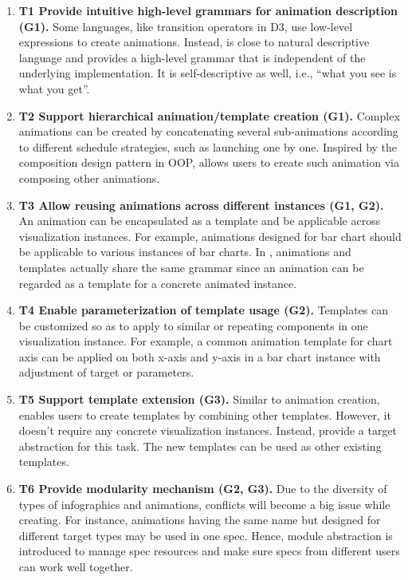 \begin{enumerate}

\item \textbf{T1 Provide intuitive high-level grammars for animation description (G1).}
Some languages, like transition operators in D3, use low-level expressions to create animations. 
Instead, \gaia{} is close to natural descriptive language and provides a high-level grammar that is independent of the underlying implementation.
It is self-descriptive as well, i.e., “what you see is what you get”.

\item \textbf{T2 Support hierarchical animation/template creation (G1).}
Complex animations can be created by concatenating several sub-animations according to different schedule strategies, such as launching one by one. 
Inspired by the composition design pattern in OOP, \gaia{} allows users to create such animation via composing other animations. 

\item \textbf{T3 Allow reusing animations across different instances (G1, G2).}
An animation can be encapsulated as a template and be applicable across visualization instances. 
For example, animations designed for bar chart should be applicable to various instances of bar charts. 
In \gaia{}, animations and templates actually share the same grammar since an animation can be regarded as a template for a concrete animated instance.

\item \textbf{T4 Enable parameterization of template usage (G2).}
Templates can be customized so as to apply to similar or repeating components in one visualization instance. 
For example, a common animation template for chart axis can be applied on both x-axis and y-axis in a bar chart instance with adjustment of target or parameters.

\item \textbf{T5 Support template extension (G3).}
Similar to animation creation, \gaia{} enables users to create templates by combining other templates. 
However, it doesn't require any concrete visualization instances. 
Instead, \gaia{} provide a target abstraction for this task. 
The new templates can be used as other existing templates.

\item \textbf{T6 Provide modularity mechanism (G2, G3).}
Due to the diversity of types of infographics and animations, conflicts will become a big issue while creating. 
For instance, animations having the same name but designed for different target types may be used in one spec. 
Hence, module abstraction is introduced to manage spec resources and make sure specs from different users can work well together.

\end{enumerate}
